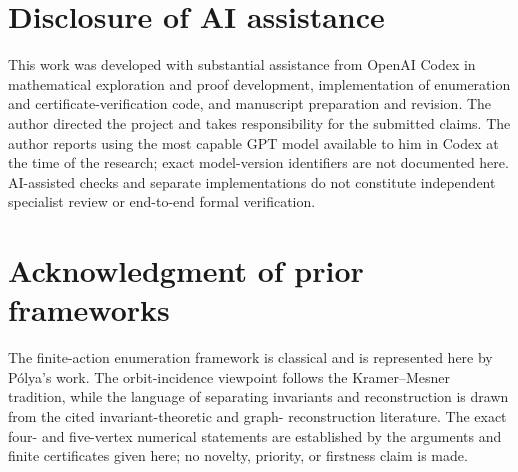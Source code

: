 \documentclass[12pt,a4paper]{article}
\begin{document}
\section*{Disclosure of AI assistance}
This work was developed with substantial assistance from OpenAI Codex in
mathematical exploration and proof development, implementation of enumeration
and certificate-verification code, and manuscript preparation and revision.
The author directed the project and takes responsibility for the submitted
claims.  The author reports using the most capable GPT model available to him
in Codex at the time of the research; exact model-version identifiers are not
documented here.  AI-assisted checks and separate implementations do not
constitute independent specialist review or end-to-end formal verification.

\section*{Acknowledgment of prior frameworks}
The finite-action enumeration framework is classical and is represented here
by P\'olya's work.  The orbit-incidence viewpoint follows the
Kramer--Mesner tradition, while the language of separating invariants and
reconstruction is drawn from the cited invariant-theoretic and graph-
reconstruction literature.  The exact four- and five-vertex numerical
statements are established by the arguments and finite certificates given
here; no novelty, priority, or firstness claim is made.

\begingroup
\small


\endgroup
\end{document}

